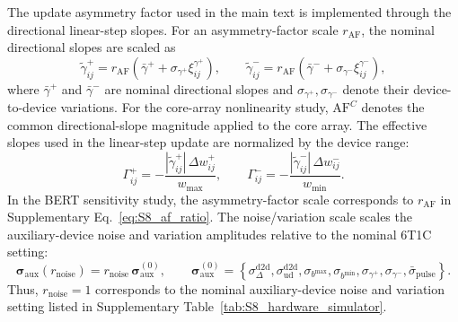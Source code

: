 \documentclass[fleqn,10pt]{wlscirep}
\begin{document}
\noindent
The update asymmetry factor used in the main text is implemented through the directional linear-step slopes. For an asymmetry-factor scale \(r_{\mathrm{AF}}\), the nominal directional slopes are scaled as
\begin{equation}
\widetilde{\gamma}^{+}_{ij}
=
r_{\mathrm{AF}}
\left(
\bar{\gamma}^{+}
+
\sigma_{\gamma^{+}}\xi_{ij}^{\gamma^{+}}
\right),
\qquad
\widetilde{\gamma}^{-}_{ij}
=
r_{\mathrm{AF}}
\left(
\bar{\gamma}^{-}
+
\sigma_{\gamma^{-}}\xi_{ij}^{\gamma^{-}}
\right),
\label{eq:S8_af_ratio}
\end{equation}
where \(\bar{\gamma}^{+}\) and \(\bar{\gamma}^{-}\) are nominal directional slopes and \(\sigma_{\gamma^{+}},\sigma_{\gamma^{-}}\) denote their device-to-device variations. For the core-array nonlinearity study, \(\mathrm{AF}^{C}\) denotes the common directional-slope magnitude applied to the core array. The effective slopes used in the linear-step update are normalized by the device range:
\begin{equation}
\Gamma^{+}_{ij}
=
-\frac{|\widetilde{\gamma}^{+}_{ij}|\,\Delta w^{+}_{ij}}{w_{\max}},
\qquad
\Gamma^{-}_{ij}
=
-\frac{|\widetilde{\gamma}^{-}_{ij}|\,\Delta w^{-}_{ij}}{w_{\min}} .
\label{eq:S8_effective_slope}
\end{equation}
In the BERT sensitivity study, the asymmetry-factor scale corresponds to \(r_{\mathrm{AF}}\) in Supplementary Eq.~\eqref{eq:S8_af_ratio}. The noise/variation scale scales the auxiliary-device noise and variation amplitudes relative to the nominal 6T1C setting:
\begin{equation}
\boldsymbol{\sigma}_{\mathrm{aux}}(r_{\mathrm{noise}})
=
r_{\mathrm{noise}}\,
\boldsymbol{\sigma}_{\mathrm{aux}}^{(0)},
\qquad
\boldsymbol{\sigma}_{\mathrm{aux}}^{(0)}
=
\left\{
\sigma_{\Delta}^{\mathrm{d2d}},
\sigma_{\mathrm{ud}}^{\mathrm{d2d}},
\sigma_{b^{\max}},
\sigma_{b^{\min}},
\sigma_{\gamma^{+}},
\sigma_{\gamma^{-}},
\bar{\sigma}_{\mathrm{pulse}}
\right\}.
\label{eq:S8_noise_ratio}
\end{equation}
Thus, \(r_{\mathrm{noise}}=1\) corresponds to the nominal auxiliary-device noise and variation setting listed in Supplementary Table~\ref{tab:S8_hardware_simulator}.
\end{document}
